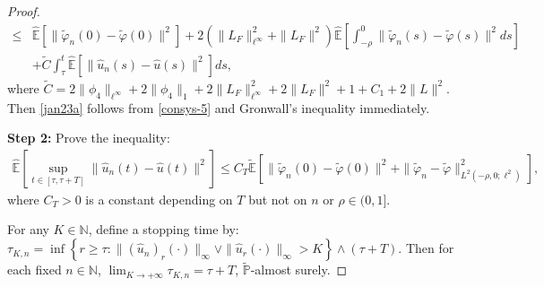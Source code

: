 \documentclass[10pt,a4paper]{amsart}
\begin{document}
\begin{proof}
\begin{align}
   \le & \widehat{\mathbb{E}} \left[ \|\widetilde{\varphi}_n(0) - \widetilde{\varphi}(0)\|^2 \right]
          + 2 \left( \|L_{F}\|_{\ell^\infty}^2 + \|L_{F}\|^2 \right)
            \widehat{\mathbb{E}}
                     \left[ \int_{-\rho}^{0}
                                  \| \widetilde{ \varphi}_n(s) - \widetilde{\varphi}(s) \|^2 ds
                     \right]   \nonumber\\
        & + \widetilde{C} \int_{\tau}^{t}
                                \widehat{\mathbb{E}} \left[ \|\hat{u}_{n}(s) - \hat{u}(s)\|^2 \right] ds,
 \end{align}
 where
      $\widetilde{C} = 2 \|\phi_4\|_{\ell^\infty} + 2 \|\phi_4\|_1
                                   + 2 \|L_{F}\|_{\ell^\infty}^2 + 2 \|L_{F}\|^2 + 1
                                   + C_1 + 2 \| L \|^2
      $.
Then \eqref{jan23a}
follows from 
  \eqref{consys-5} and Gronwall's inequality
  immediately.
   
 
 {\bf Step 2:}  Prove   the inequality:
 \begin{align}\label{jan23b}
       \widehat{\mathbb{E}}
             \left[ \sup_{t \in [\tau, \tau +T]}
                            \| \hat{u}_n(t) - \hat{u}(t) \|^2 
             \right]
  \le C_T
              \widetilde{\mathbb{E}} 
                   \left[ \| \widetilde{\varphi}_n(0) - \widetilde{\varphi}(0) \|^2  
                            + \| \widetilde{\varphi}_n - \widetilde{\varphi} \|^2_{L^2(-\rho, 0; \ell^2)}     
                  \right],
 \end{align} 
 where  $C_T > 0$
 is a constant depending on $T$ but not on $n$ or $\rho \in (0, 1]$.
 
  For any $K \in \mathbb{N}$, define 
  a  stopping time by:
    $\tau_{K,n}
     = \inf
           \left\{ r \ge \tau:
                     \| (\hat{u}_n)_{r} (\cdot)\|_{\infty}
                     \vee
                     \|\hat{u}_{r}(\cdot)\|_{\infty}
                     > K
           \right\}
       \wedge (\tau + T)$.
 Then for each fixed  $n \in \mathbb{N}$, $\lim_{K \to +\infty} \tau_{K,n} = \tau + T$,  $\widetilde{\mathbb{P}}$-almost surely.
 

\end{proof}
\end{document}
